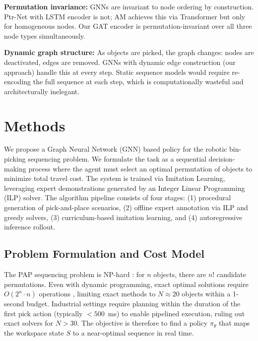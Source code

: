 \documentclass[conference]{IEEEtran}
\begin{document}
\textbf{Permutation invariance:} GNNs are invariant to node ordering by construction. Ptr-Net with LSTM encoder is not; AM achieves this via Transformer but only for homogeneous nodes. Our GAT encoder is permutation-invariant over all three node types simultaneously.

\textbf{Dynamic graph structure:} As objects are picked, the graph changes: nodes are deactivated, edges are removed. GNNs with dynamic edge construction (our approach) handle this at every step. Static sequence models would require re-encoding the full sequence at each step, which is computationally wasteful and architecturally inelegant.

\section{Methods}\label{sec:methods}

We propose a Graph Neural Network (GNN) based policy for the robotic bin-picking sequencing problem. We formulate the task as a sequential decision-making process where the agent must select an optimal permutation of objects to minimize total travel cost. The system is trained via Imitation Learning, leveraging expert demonstrations generated by an Integer Linear Programming (ILP) solver. The algorithm pipeline consists of four stages: (1) procedural generation of pick-and-place scenarios, (2) offline expert annotation via ILP and greedy solvers, (3) curriculum-based imitation learning, and (4) autoregressive inference rollout.

\subsection{Problem Formulation and Cost Model}

The PAP sequencing problem is NP-hard \cite{chalasani1996}: for $n$ objects, there are $n!$ candidate permutations. Even with dynamic programming, exact optimal solutions require $O(2^n \cdot n)$ operations \cite{han2019pap}, limiting exact methods to $N \approx 20$ objects within a 1-second budget. Industrial settings require planning within the duration of the first pick action (typically $<500$~ms) to enable pipelined execution, ruling out exact solvers for $N > 30$. The objective is therefore to find a policy $\pi_\theta$ that maps the workspace state $S$ to a near-optimal sequence in real time.
\end{document}
